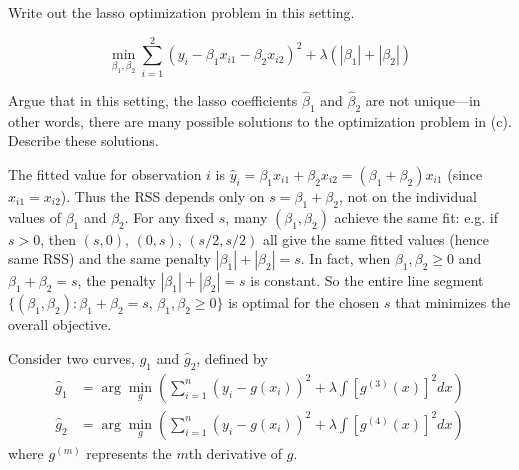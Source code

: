 \documentclass{article}
\begin{document}
\begin{probset}
\begin{prob}
\begin{subprobset}
        \begin{subprob}
            Write out the lasso optimization problem in this setting.

            \begin{soln}
                \[
                    \min_{\beta_1, \beta_2} \sum_{i=1}^2 (y_i - \beta_1 x_{i1} - \beta_2 x_{i2})^2 + \lambda (|\beta_1| + |\beta_2|)
                \]
            \end{soln}
        \end{subprob}

        \begin{subprob}
            Argue that in this setting, the lasso coefficients $\hat{\beta}_1$ and $\hat{\beta}_2$ are not unique—in other words, there are many possible solutions to the optimization problem in (c). Describe these solutions.

            \begin{soln}
                The fitted value for observation $i$ is $\hat{y}_i = \beta_1 x_{i1} + \beta_2 x_{i2} = (\beta_1 + \beta_2)x_{i1}$ (since $x_{i1} = x_{i2}$). Thus the RSS depends only on $s = \beta_1 + \beta_2$, not on the individual values of $\beta_1$ and $\beta_2$. For any fixed $s$, many $(\beta_1, \beta_2)$ achieve the same fit: e.g. if $s > 0$, then $(s, 0)$, $(0, s)$, $(s/2, s/2)$ all give the same fitted values (hence same RSS) and the same penalty $|\beta_1| + |\beta_2| = s$. In fact, when $\beta_1, \beta_2 \geq 0$ and $\beta_1 + \beta_2 = s$, the penalty $|\beta_1| + |\beta_2| = s$ is constant. So the entire line segment $\{(\beta_1, \beta_2) : \beta_1 + \beta_2 = s$, $\beta_1, \beta_2 \geq 0\}$ is optimal for the chosen $s$ that minimizes the overall objective.
            \end{soln}
        \end{subprob}
    \end{subprobset}
\end{prob}

\newpage

\begin{prob}
    Consider two curves, $\hat{g}_1$ and $\hat{g}_2$, defined by 
    \begin{align*}
        \hat{g}_1 &= \arg \min_{g} \left( \sum_{i=1}^n (y_i - g(x_i))^2 + \lambda \int \left[ g^{(3)}(x) \right]^2 dx \right) \\
        \hat{g}_2 &= \arg \min_{g} \left( \sum_{i=1}^n (y_i - g(x_i))^2 + \lambda \int \left[ g^{(4)}(x) \right]^2 dx \right)
    \end{align*}
    where $g^{(m)}$ represents the $m$th derivative of $g$.


\end{prob}
\end{probset}
\end{document}
